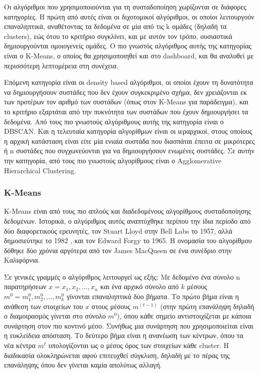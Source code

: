 \documentclass{article}
\begin{document}
Οι αλγόριθμοι που χρησιμοποιούνται για τη συσταδοποίηση χωρίζονται σε διάφορες κατηγορίες. Η πρώτη από αυτές είναι οι διχοτομικοί αλγόριθμοι, οι οποίοι λειτουργούν επαναληπτικά, αναθέτοντας τα δεδομένα σε μία από τις k ομάδες (δηλαδή τα clusters), εώς ότου το κριτήριο συγκλίνει, και με αυτόν τον τρόπο, ουσιαστικά δημιουργούνται ομοιογενείς ομάδες. \cite{sen2020supervised} Ο πιο γνωστός αλγόριθμος αυτής της κατηγορίας είναι ο K-Means, ο οποίος θα χρησιμοποιηθεί και στο dashboard, και θα αναλυθεί με περισσότερη λεπτομέρεια στη συνέχεια.

Επόμενη κατηγορία είναι οι density based αλγόριθμοι, οι οποίοι έχουν τη δυνατότητα να δημιουργήσουν συστάδες που δεν έχουν συγκεκριμένο σχήμα, δεν χρειάζονται εκ των προτέρων τον αριθμό των συστάδων (όπως στον K-Means για παράδειγμα), και το κριτήριο εξαρτάται από την πυκνότητα των συστάδων που έχουν δημιουργήσει τα δεδομένα. Από τους πιο γνωστούς αλγόριθμους αυτής της κατηγορία είναι ο DBSCAN. Και η τελευταία κατηγορία αλγορίθμων είναι οι ιεραρχικοί, στους οποίους η αρχική κατάσταση είναι είτε μία ενιαία συστάδα που διασπάται έπειτα σε μικρότερες ή n συστάδες που συγχωνεύονται για να δημιουργήσουν ενωμένες συστάδες. Σε αυτήν την κατηγορία, από τους πιο γνωστούς αλγορίθμους είναι ο Agglomerative Hierarchical Clustering. \cite{sen2020supervised}

\subsubsection{K-Means}

 K-Means είναι από τους πιο απλούς και διαδεδομένους αλγορίθμους συσταδοποίησης δεδομένων. Ιστορικά, ο αλγόριθμος αυτός αναπτύχθηκε περίπου την ίδια περίοδο από δύο διαφορετικούς ερευνητές, τον Stuart Lloyd στην Bell Labs το 1957, αλλά δημοσιεύτηκε το 1982 \cite{lloyd1982least}, και τον Edward Forgy το 1965. \cite{forgy1965cluster} Η ονομασία του αλγορίθμου δόθηκε δύο χρόνια αργότερα από τον James MacQueen σε ένα συνέδριο στην Καλιφόρνια. \cite{macqueen1967some}

Σε γενικές γραμμές ο αλγόριθμος λειτουργεί ως εξής: Με δεδομένο ένα σύνολο n παρατηρήσεων $x={x_1,x_2,…,x_n}$ και ένα αρχικό σύνολο από $k$ μέσους $m^0={m_1^0,m_2^0,…,m_k^0}$ γίνονται επαναληπτικά δύο βήματα. Το πρώτο βήμα είναι η ανάθεση των στοιχείων του $x$ στους μέσους $m^{(t-1)}$ (στην πρώτη επανάληψη δηλαδή ο διαμοιρασμός γίνεται στο σύνολο $m^0$), όπου κάθε σημείο αντιστοιχίζεται με κάποια συνάρτηση στον πιο κοντινό μέσο. Συνήθως μια συνάρτηση που χρησιμοποιείται είναι η ευκλείδεια απόσταση. Το δεύτερο βήμα είναι η ανανέωση των κέντρων, όπου τα νέα κέντρα $m^t$ υπολογίζονται ως ο μέσος όρος των στοιχείων κάθε cluster. Η διαδικασία ολοκληρώνεται αφού επιτευχθεί σύγκλιση, δηλαδή με το πέρας της επανάληψης όπου δεν γίνεται καμία απολύτως αλλαγή.
\end{document}
